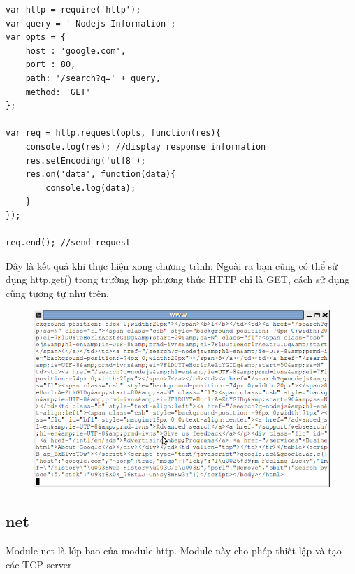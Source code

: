 	\begin{verbatim}
var http = require('http');
var query = ' Nodejs Information';
var opts = {
	host : 'google.com',
    port : 80,
    path: '/search?q=' + query,
    method: 'GET'
};

var req = http.request(opts, function(res){
	console.log(res); //display response information 
    res.setEncoding('utf8');
    res.on('data', function(data){
		console.log(data);
    }
});

req.end(); //send request
	\end{verbatim}
	
	Đây là kết quả khi thực hiện xong chương trình:
	Ngoài ra bạn cũng có thể sử dụng http.get() trong trường hợp phương thức HTTP chỉ là GET, cách sử dụng cũng tương tự như trên.
	\begin{figure}[h]
		\centering
		\includegraphics[scale=0.7]{3_3_6}
	\end{figure}
	
\subsection{net}
	Module net là lớp bao của module http. Module này cho phép thiết lập và tạo các TCP server.
